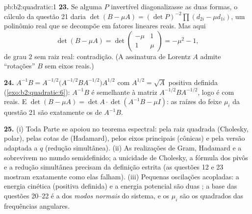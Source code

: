 \begin{solution}{pb:b2:quadratic:1}
\textbf{23.} Se alguma $P$ invertível diagonalizasse as duas formas,
o cálculo da questão 21 daria $\det(B - \mu A) = (\det
P)^{-2}\prod(d_{2i} - \mu d_{1i})$, um polinômio real que se decompõe
em fatores lineares reais. Mas aqui
\[
\det(B - \mu A) = \det\begin{pmatrix} -\mu & 1\\ 1 &
\mu\end{pmatrix} = -\mu^2 - 1 ,
\]
de grau $2$ sem raiz real: contradição. (A assinatura
de Lorentz $A$ admite ``rotações'' $B$ sem eixos
reais.)

\textbf{24.} $A^{-1}B = A^{-1/2}\bigl(A^{-1/2}BA^{-1/2}\bigr)
A^{1/2}$ com $A^{1/2} = \sqrt A$ positiva definida
(\cref{exo:b2:quadratic:6}): $A^{-1}B$ é semelhante à
matriz \emph{} $A^{-1/2}BA^{-1/2}$, logo é  com
 reais. E $\det(B - \mu A) = \det A\cdot
\det(A^{-1}B - \mu I)$: as raízes do feixe $\mu_i$ da questão
21 são exatamente os  de $A^{-1}B$.

\textbf{25.} (i) Toda Parte se apoiou no teorema espectral:
pela raiz quadrada (Cholesky, polar), pelas cotas de
 (Hadamard), pelos eixos principais (cônicas) e pela
versão adaptada a $q$ (redução simultânea). (ii) As realizações
de Gram, Hadamard e a  sobrevivem no
mundo semidefinido; a unicidade de Cholesky, a fórmula dos
pivôs e a redução simultânea precisam da definição estrita
(as questões 12 e 23 mostram exatamente como elas falham). (iii)
Pequenas oscilações acopladas: a energia cinética (positiva definida)
e a energia potencial são duas ; a base das
questões 20--22 é a dos \emph{modos normais} do sistema, e os
$\mu_i$ são os quadrados das frequências angulares.
\end{solution}
